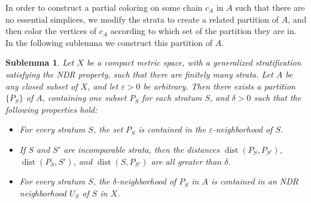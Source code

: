 \documentclass[psamsfonts]{amsart}
\newtheorem{sublemma}[theorem]{Sublemma}
\theoremstyle{remark}
\DeclareMathOperator{\dist}{dist}
\begin{document}
In order to construct a partial coloring on some chain $c_A$ in $A$ such that there are no essential simplices, we modify the strata to create a related partition of $A$, and then color the vertices of $c_A$ according to which set of the partition they are in.  In the following sublemma we construct this partition of $A$.

\begin{sublemma}\label{partition}
Let $X$ be a compact metric space, with a generalized stratification satisfying the NDR property, such that there are finitely many strata.  Let $A$ be any closed subset of $X$, and let $\varepsilon > 0$ be arbitrary.  Then there exists a partition $\{P_S\}$ of $A$, containing one subset $P_S$ for each stratum $S$, and $\delta > 0$ such that the following properties hold:
\begin{itemize}
\item For every stratum $S$, the set $P_S$ is contained in the $\varepsilon$-neighborhood of $S$.
\item If $S$ and $S'$ are incomparable strata, then the distances $\dist(P_S, P_{S'})$, $\dist(P_S, S')$, and $\dist(S, P_{S'})$ are all greater than $\delta$.
\item For every stratum $S$, the $\delta$-neighborhood of $P_S$ in $A$ is contained in an NDR neighborhood $U_S$ of $S$ in $X$.
\end{itemize}
\end{sublemma}
\end{document}
